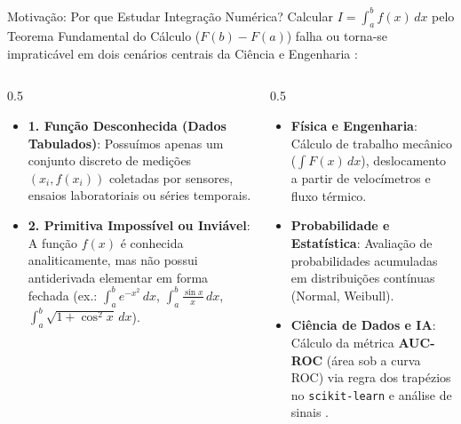 \documentclass[aspectratio=169]{beamer}
\newcommand{\highlight}[1]{\textcolor{primary}{\textbf{#1}}}
\newcommand{\code}[1]{\texttt{#1}}
\begin{document}
\begin{frame}{Motivação: Por que Estudar Integração Numérica?}
\footnotesize
Calcular $I = \int_a^b f(x)\,dx$ pelo Teorema Fundamental do Cálculo ($F(b) - F(a)$) falha ou torna-se impraticável em dois cenários centrais da Ciência e Engenharia \cite{santos2010, mesquita2026, burden2016}:

\begin{columns}[T]
\begin{column}{0.5\textwidth}
\begin{bee}
\begin{itemize}\scriptsize
    \item \textbf{1. Função Desconhecida (Dados Tabulados)}: Possuímos apenas um conjunto discreto de medições $(x_i, f(x_i))$ coletadas por sensores, ensaios laboratoriais ou séries temporais.
    \item \textbf{2. Primitiva Impossível ou Inviável}: A função $f(x)$ é conhecida analiticamente, mas não possui antiderivada elementar em forma fechada (ex.: $\int_a^b e^{-x^2}\,dx$, $\int_a^b \frac{\sin x}{x}\,dx$, $\int_a^b \sqrt{1 + \cos^2 x}\,dx$).
\end{itemize}
\end{bee}
\end{column}

\begin{column}{0.5\textwidth}
\begin{bee}
\begin{itemize}\scriptsize
    \item \textbf{Física e Engenharia}: Cálculo de trabalho mecânico ($\int F(x)\,dx$), deslocamento a partir de velocímetros e fluxo térmico.
    \item \textbf{Probabilidade e Estatística}: Avaliação de probabilidades acumuladas em distribuições contínuas (Normal, Weibull).
    \item \textbf{Ciência de Dados e IA}: Cálculo da métrica \highlight{AUC-ROC} (área sob a curva ROC) via regra dos trapézios no \code{scikit-learn} e análise de sinais \cite{chapra2016, scipy_trapezoid}.
\end{itemize}
\end{bee}
\end{column}
\end{columns}
\end{frame}
\end{document}
